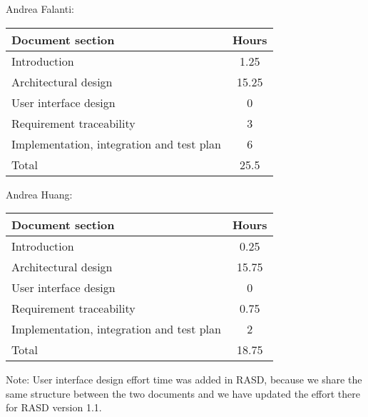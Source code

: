 Andrea Falanti:

\begin{tabular}{|l|c|}
    \hline
    Document section & Hours \\
    \hline
     Introduction & 1.25\\
     Architectural design & 15.25\\
     User interface design & 0\\
     Requirement traceability & 3\\
     Implementation, integration and test plan & 6\\
     \hline
     Total & 25.5\\
     \hline
\end{tabular}
\vskip 0.3in

Andrea Huang:

\begin{tabular}{|l|c|}
    \hline
    Document section & Hours \\
    \hline
     Introduction & 0.25\\
     Architectural design & 15.75\\
     User interface design & 0\\
     Requirement traceability & 0.75\\
     Implementation, integration and test plan & 2\\
     \hline
     Total & 18.75\\
     \hline
\end{tabular}

\bigskip
\bigskip
Note: User interface design effort time was added in RASD, because we share the same structure between the two documents and we have updated the effort there for RASD version 1.1. 